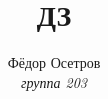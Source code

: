 \documentclass[12pt, fleqn]{article}
\title{\textbf{ДЗ}}
\author{Фёдор Осетров\\ \textit{группа 203}}
\begin{document}
    {\large
    \maketitle

    }
\end{document}
